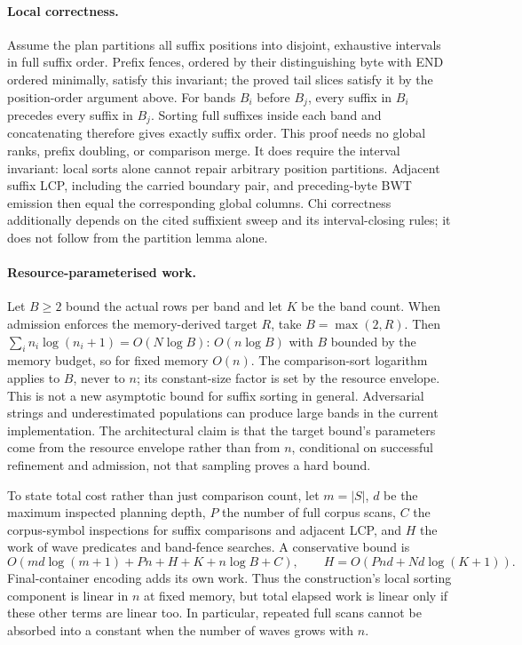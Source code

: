 \documentclass[10pt]{article}
\begin{document}
\paragraph{Local correctness.}
Assume the plan partitions all suffix positions into disjoint, exhaustive intervals in full
suffix order. Prefix fences, ordered by their distinguishing byte with END ordered minimally,
satisfy this invariant; the proved tail slices satisfy it by the position-order argument above.
For bands $B_i$ before $B_j$, every suffix in $B_i$ precedes every suffix in $B_j$.
Sorting full suffixes inside each band and concatenating therefore gives exactly suffix order.
This proof needs no global ranks, prefix doubling, or comparison merge. It does require the
interval invariant: local sorts alone cannot repair arbitrary position partitions. Adjacent
suffix LCP, including the carried boundary pair, and preceding-byte BWT emission then equal
the corresponding global columns. Chi correctness additionally depends on the cited suffixient
sweep and its interval-closing rules; it does not follow from the partition lemma alone.

\paragraph{Resource-parameterised work.}
Let $B\geq 2$ bound the actual rows per band and let $K$ be the band count.
When admission enforces the memory-derived target $R$, take $B=\max(2,R)$.
Then $\sum_i n_i\log(n_i+1)=O(N\log B)$: $O(n\log B)$ with $B$ bounded by the memory
budget, so for fixed memory $O(n)$. The comparison-sort logarithm applies to
$B$, never to $n$; its constant-size factor is set by the resource envelope.
This is not a new asymptotic bound for suffix sorting in general. Adversarial
strings and underestimated populations can produce large bands in the current
implementation. The architectural claim is that the target bound's parameters
come from the resource envelope rather than from $n$, conditional on successful
refinement and admission, not that sampling proves a hard bound.

To state total cost rather than just comparison count, let $m=|S|$, $d$ be the
maximum inspected planning depth, $P$ the number of full corpus scans, $C$ the
corpus-symbol inspections for suffix comparisons and adjacent LCP, and $H$ the
work of wave predicates and band-fence searches. A conservative bound is
\[
 O(md\log(m+1)+Pn+H+K+n\log B+C),
 \qquad H=O(Pnd+Nd\log(K+1)).
\]
Final-container encoding adds its own work. Thus the construction's local sorting
component is linear in $n$ at fixed memory, but total elapsed work is linear only
if these other terms are linear too. In particular, repeated full scans cannot
be absorbed into a constant when the number of waves grows with $n$.
\end{document}
